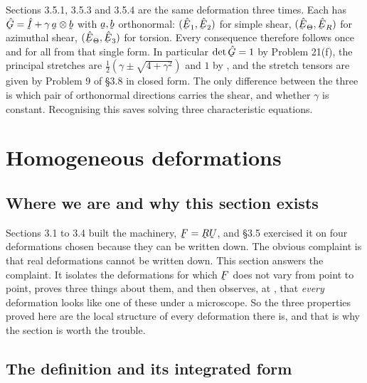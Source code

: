 \begin{remark}\label{rem:threeshears}
Sections 3.5.1, 3.5.3 and 3.5.4 are the same deformation three times.
Each has $\hat\bG=\hI+\gamma\,\ba\otimes\bb$ with $\ba,\bb$ orthonormal:
$(\hbE_{1},\hbE_{2})$ for simple shear, $(\hETh,\hER)$ for azimuthal
shear, $(\hETh,\hbE_{3})$ for torsion. Every consequence therefore follows
once and for all from that single form. In particular $\det\hat\bG=1$ by
Problem 21(f), the principal stretches are $\tfrac12(\gamma\pm
\sqrt{4+\gamma^{2}})$ and $1$ by , and the stretch tensors are
given by Problem 9 of \S3.8 in closed form. The only difference between
the three is which pair of orthonormal directions carries the shear, and
whether $\gamma$ is constant. Recognising this saves solving three
characteristic equations.
\end{remark}

\section{Homogeneous deformations}\label{sec:homog}

\subsection*{Where we are and why this section exists}

Sections 3.1 to 3.4 built the machinery, $\bF=\bR\bU$, and \S3.5 exercised
it on four deformations chosen because they can be written down. The
obvious complaint is that real deformations cannot be written down. This
section answers the complaint. It isolates the deformations for which
$\bF$ does not vary from point to point, proves three things about them,
and then observes, at , that \emph{every} deformation looks like
one of these under a microscope. So the three properties proved here are
the local structure of every deformation there is, and that is why the
section is worth the trouble.

\subsection*{The definition and its integrated form}

